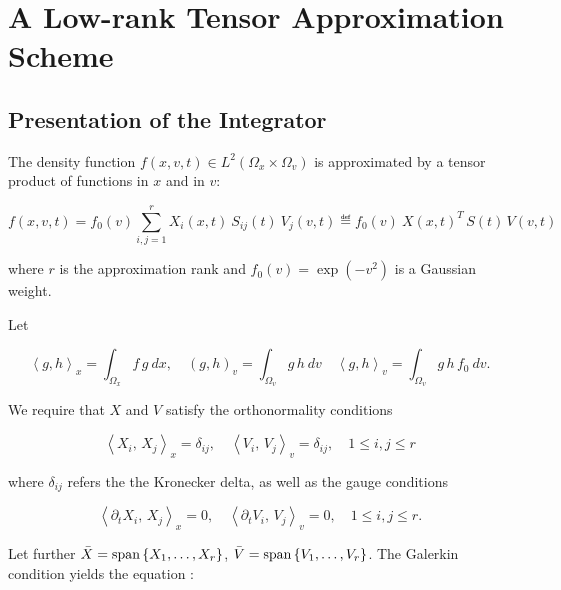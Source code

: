 
\section{A Low-rank Tensor Approximation Scheme}\label{sec:lowrank}

\subsection{Presentation of the Integrator}

The density function $f(x, v, t) \in L^2 (\Omega_x \times \Omega_v)$ is approximated by a 
tensor product of functions in $x$ and in $v$:

\begin{equation}
    f(x, v, t) = f_0 (v) \sum_{i, j = 1}^{r} X_i (x, t)\ S_{i j} (t)\ V_j (v, t)
    \eqdef f_0 (v)\ X (x, t)^T \,S (t) \,V (v, t)
\end{equation}

where $r$ is the approximation rank and $f_0 (v) = \exp ( - v^2 )$ is a Gaussian weight. 

Let 

\begin{equation}
    \left\langle g, h \right\rangle_x = \int_{\Omega_x} f\,g\ dx, \quad 
    (g, h)_v = \int_{\Omega_v} g\,h\ dv \quad 
    \left\langle g, h \right\rangle_v = \int_{\Omega_v} g\, h\, f_0\ dv . 
\end{equation}

We require that $X$ and $V$ satisfy the orthonormality conditions 

\begin{equation}\label{eq:orthonormal}
    \left\langle X_i,\, X_j \right\rangle_x = \delta_{i j}, \quad 
    \left\langle V_i,\, V_j \right\rangle_v = \delta_{i j}, \quad 
    1 \leq i, j \leq r 
\end{equation}

where $\delta_{i j}$ refers the the Kronecker delta, as well as the gauge conditions 

\begin{equation}\label{eq:gauge}
    \left\langle \partial_t X_i,\, X_j \right\rangle_x = 0, \quad 
    \left\langle \partial_t V_i,\, V_j \right\rangle_v = 0, \quad 
    1 \leq i, j \leq r . 
\end{equation}

Let further $\bar{X} = \text{span} \left\{ X_1, \ldots, X_r \right\}$, 
$\bar{V} = \text{span} \left\{ V_1, \ldots, V_r \right\}$. The Galerkin condition yields the 
equation \cite{einkemmer2018}:

